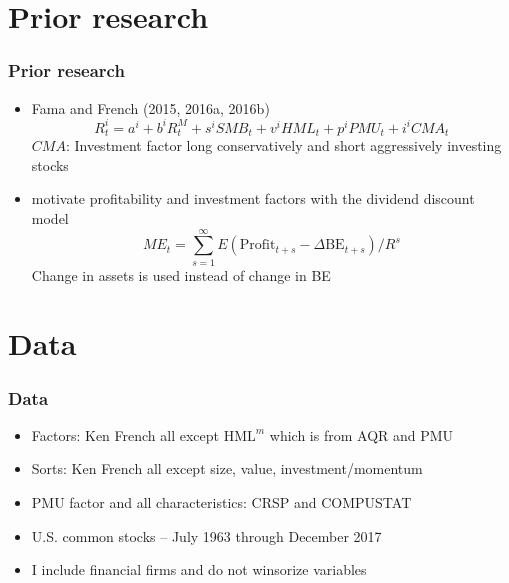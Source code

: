 \documentclass[notes]{beamer}  %
\begin{document}

\section{Prior research}

\begin{frame} \frametitle{Prior research}
  \begin{itemize}
    \item Fama and French (2015, 2016a, 2016b)
    \begin{equation} \label{eq:F16}
      R_t^i=a^i + b^iR_t^M + s^iSMB_t + v^iHML_t + p^iPMU_t + i^iCMA_t
    \end{equation}
    $CMA$: Investment factor long conservatively and short aggressively
    investing stocks
    \item \textcite{fama2006profitability} motivate profitability and
    investment factors with the dividend discount model
    \[ME_t =
    \sum_{s=1}^\infty E\left( \text{Profit}_{t+s}-
    \Delta\text{BE}_{t+s}\right) /R^s\]
    Change in assets is used instead of change in BE
  \end{itemize}
\end{frame}


\section{Data}

\begin{frame}
  \frametitle{Data}
  \begin{itemize}
    \item Factors: Ken French all except $\text{HML}^m$ which is from AQR
    and PMU
    \item Sorts: Ken French all except size, value, investment/momentum
    \item PMU factor and all characteristics: CRSP and COMPUSTAT
    \item U.S. common stocks -- July 1963 through December 2017
    \item I include financial firms and do not winsorize variables
  \end{itemize}
\end{frame}
\end{document}
